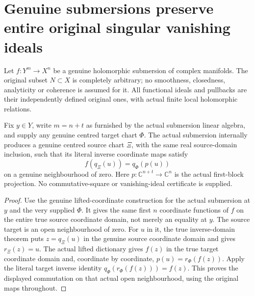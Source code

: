 \section{Genuine submersions preserve entire original singular vanishing ideals}

Let $f:Y^m\to X^n$ be a genuine holomorphic submersion of complex
manifolds. The original subset $N\subset X$ is completely arbitrary;
no smoothness, closedness, analyticity or coherence is assumed for it.
All functional ideals and pullbacks are their independently defined
original ones, with actual finite local holomorphic relations.

\begin{lemma}
\label{hir:actual-singular-submersion-inverse-product-coordinates}
\leanok
Fix $y\in Y$, write $m=n+t$ as furnished by the actual submersion
linear algebra, and supply any genuine centred target chart $\Phi$. The actual submersion
internally produces a genuine centred source chart $\Xi$, with the
same real source-domain inclusion, such that its literal inverse
coordinate maps satisfy
\[
 f(q_\Xi(u))=q_\Phi(p(u))
\]
on a genuine neighbourhood of zero. Here $p:\mathbb C^{n+t}\to\mathbb C^n$
is the actual first-block projection. No commutative-square or
vanishing-ideal certificate is supplied.
\end{lemma}
\begin{proof}
Use the genuine lifted-coordinate construction for the actual submersion
at $y$ and the very supplied $\Phi$. It gives the same first $n$
coordinate functions of $f$ on the entire true source coordinate domain,
not merely an equality at $y$. The source target is an open neighbourhood
of zero. For $u$ in it, the true inverse-domain theorem puts
$z=q_\Xi(u)$ in the genuine source coordinate domain and gives
$r_\Xi(z)=u$. The actual lifted dictionary gives $f(z)$ in the true
target coordinate domain and, coordinate by coordinate,
$p(u)=r_\Phi(f(z))$. Apply the literal target inverse identity
$q_\Phi(r_\Phi(f(z)))=f(z)$. This proves the displayed commutation on
that actual open neighbourhood, using the original maps throughout.
\end{proof}

